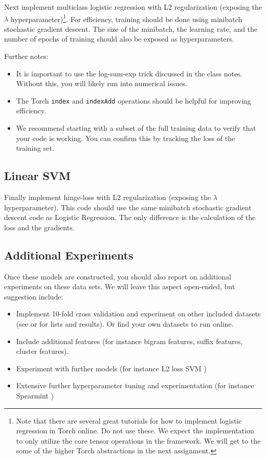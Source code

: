 \documentclass[11pt]{article}
\begin{document}
Next implement multiclass logistic regression with L2 regularization
(exposing the $\lambda$ hyperparameter)\footnote{Note that there are several great tutorials for how to implement logistic
regression in Torch online. Do not use these. We expect the
implementation to only utilize the core tensor operations in the
framework. We will get to the some of the higher Torch abstractions in the next assignment.}. For efficiency, training
should be done using minibatch stochastic gradient descent. The size
of the minibatch, the learning rate, and the number of epochs of
training should also be exposed as hyperparameters.


Further notes:

\begin{itemize}
\item It is important to use the log-sum-exp trick discussed in the
  class notes. Without this, you will likely run into numerical
  issues.

\item The Torch \texttt{index} and \texttt{indexAdd} operations should 
  be helpful for improving efficiency.

\item We recommend starting with a subset of the full training data to
  verify that your code is working. You can confirm this by tracking
  the loss of the training set.
\end{itemize}

\subsection{Linear SVM}

Finally implement hinge-loss with L2 regularization (exposing the $\lambda$
hyperparameter). This code should use the same minibatch stochastic
gradient descent code as Logistic Regression. The only difference is
the calculation of the loss and the gradients. 

\subsection{Additional Experiments}

Once these models are constructed, you should also report on
additional experiments on these data sets. We will leave this aspect
open-ended, but suggestion include:

\begin{itemize}
\item Implement 10-fold cross validation and experiment on other included datasets (see \citet{wang2012baselines} or \citet{DBLP:conf/emnlp/Kim14} for lists and results). Or find your own datasets to run online.
\item Include additional features (for instance bigram features, suffix features, cluster features).
\item Experiment with further models (for instance L2 loss SVM \citep{wang2012baselines})
\item Extensive further hyperparameter tuning and experimentation (for instance Spearmint \citep{snoek2012practical})

\end{itemize}
\end{document}
